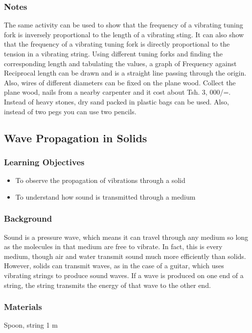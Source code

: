 \subsubsection*{Notes}
The same activity can be used to show that the frequency of a vibrating tuning fork is inversely proportional to the length of a vibrating sting. It can also show that the frequency of a vibrating tuning fork is directly proportional to the tension in a vibrating string. Using different tuning forks and finding the corresponding length and tabulating the values, a graph of Frequency against Reciprocal length can be drawn and is a straight line passing through the origin. Also, wires of different diameters can be fixed on the plane wood. Collect the plane wood, nails from a nearby carpenter and it cost about Tsh.  3, 000/=. Instead of heavy stones, dry sand packed in plastic bags can be used. Also, instead of two pegs you can use two pencils.  

\subsection{Wave Propagation in Solids}

\subsubsection*{Learning Objectives}
\begin{itemize}
\item{To observe the propagation of vibrations through a solid}
\item{To understand how sound is transmitted through a medium}
\end{itemize}

\subsubsection*{Background}
Sound is a pressure wave, which means it can travel through any medium so long as the molecules in that medium are free to vibrate.  In fact, this is every medium, though air and water transmit sound much more efficiently than solids.  However, solids can transmit waves, as in the case of a guitar, which uses vibrating strings to produce sound waves.
If a wave is produced on one end of a string, the string transmits the energy of that wave to the other end.

\subsubsection*{Materials}
Spoon, string 1 m

